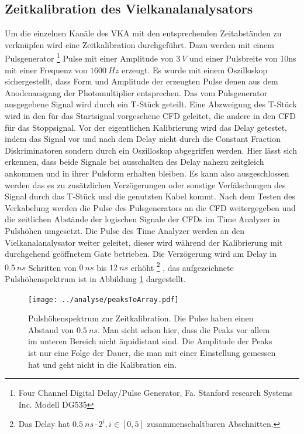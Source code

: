 \documentclass[a4paper,12pt]{article}
\begin{document}
\subsection{Zeitkalibration des Vielkanalanalysators}
Um die einzelnen Kanäle des VKA mit den entsprechenden Zeitabständen zu verknüpfen wird eine Zeitkalibration durchgeführt. Dazu werden
mit einem Pulsgenerator
\footnote{Four Channel Digital Delay/Pulse Generator, Fa. Stanford research Systems Inc. Modell DG535}
Pulse mit einer Amplitude von $\SI{3}{V}$ und einer Pulsbreite von 10ns mit
einer Frequenz von $\SI{1600}{Hz}$ erzeugt.
Es wurde mit einem Oszilloskop sichergestellt, dass Form und Amplitude der erzeugten Pulse denen aus dem Anodenausgang der Photomultiplier
entsprechen. Das vom Pulsgenerator ausgegebene Signal wird durch ein T-Stück geteilt. Eine Abzweigung des T-Stück wird in den für das Startsignal vorgesehene
CFD geleitet, die andere in den CFD für das Stoppsignal. Vor der eigentlichen Kalibrierung wird das Delay getestet, indem
das Signal vor und nach dem Delay nicht durch die Constant Fraction Diskriminatoren sondern durch ein Oszilloskop abgegriffen werden. Hier lässt sich erkennen,
dass beide Signale bei ausschalten des Delay nahezu zeitgleich ankommen und in ihrer Pulsform erhalten bleiben. Es kann also ausgeschlossen werden das es zu
zusätzlichen Verzögerungen oder sonstige Verfälschungen des Signal durch das T-Stück und die genutzten Kabel kommt.
Nach dem Testen des Verkabelung werden die Pulse des Pulsgenerators an die CFD weitergegeben und die zeitlichen Abstände der logischen Signale der CFDs im Time Analyzer
in Pulshöhen umgesetzt. Die Pulse des Time Analyzer werden an den Vielkanalanalysator weiter geleitet, dieser wird während der Kalibrierung mit
durchgehend geöffnetem Gate betrieben. Die Verzögerung wird am Delay in $\SI{0.5}{ns}$ Schritten von $\SI{0}{ns}$ bis $\SI{12}{ns}$ erhöht
\footnote{Das Delay hat $\SI{0.5}{ns}\cdot 2^{i}, i\in[0,5]$ zusammenschaltbaren
Abschnitten.}
, das aufgezeichnete Pulshöhenspektrum
ist in Abbildung \ref{fig:pulsSpektrum} dargestellt.

\begin{figure}[h]
	\texttt{[image: ../analyse/peaksToArray.pdf]}
	\caption{Pulshöhenspektrum zur Zeitkalibration. Die Pulse haben einen Abstand von
		$\SI{0.5}{ns}$. Man sieht schon hier, dass die Peaks vor allem im unteren Bereich nicht
	äquidistant sind. Die Amplitude der Peaks ist nur eine Folge der Dauer, die man mit einer Einstellung
gemessen hat und geht nicht in die Kalibration ein.}
	\label{fig:pulsSpektrum}
\end{figure}
\end{document}
